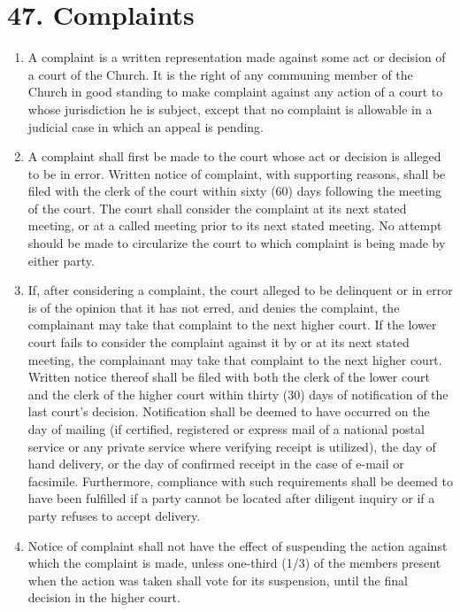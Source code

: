 \documentclass[
]{book}
\providecommand{\tightlist}{%
  \setlength{\itemsep}{0pt}\setlength{\parskip}{0pt}}
\begin{document}
\hypertarget{complaints}{%
\section*{47. Complaints}\label{complaints}}

\protect\hypertarget{chapter-slug-47-complaints}{\href{}{}}

\begin{enumerate}
\def\labelenumi{\arabic{enumi}.}
\tightlist
\item
  \protect\hypertarget{47}{\href{}{}}A complaint is a written representation made against some act or decision of a court of the Church. It is the right of any communing member of the Church in good standing to make complaint against any action of a court to whose jurisdiction he is subject, except that no complaint is allowable in a judicial case in which an appeal is pending.
\item
  A complaint shall first be made to the court whose act or decision is alleged to be in error. Written notice of complaint, with supporting reasons, shall be filed with the clerk of the court within sixty (60) days following the meeting of the court. The court shall consider the complaint at its next stated meeting, or at a called meeting prior to its next stated meeting. No attempt should be made to circularize the court to which complaint is being made by either party.
\item
  If, after considering a complaint, the court alleged to be delinquent or in error is of the opinion that it has not erred, and denies the complaint, the complainant may take that complaint to the next higher court. If the lower court fails to consider the complaint against it by or at its next stated meeting, the complainant may take that complaint to the next higher court. Written notice thereof shall be filed with both the clerk of the lower court and the clerk of the higher court within thirty (30) days of notification of the last court's decision. Notification shall be deemed to have occurred on the day of mailing (if certified, registered or express mail of a national postal service or any private service where verifying receipt is utilized), the day of hand delivery, or the day of confirmed receipt in the case of e-mail or facsimile. Furthermore, compliance with such requirements shall be deemed to have been fulfilled if a party cannot be located after diligent inquiry or if a party refuses to accept delivery.
\item
  Notice of complaint shall not have the effect of suspending the action against which the complaint is made, unless one-third (1/3) of the members present when the action was taken shall vote for its suspension, until the final decision in the higher court.

\end{enumerate}
\end{document}
